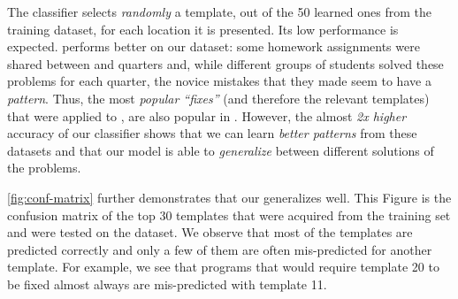 The \random classifier selects \emph{randomly} a template, out of the 50 learned
ones from the \SPRING training dataset, for each location it is presented. Its
low performance is expected. \popular performs better on our dataset: some
homework assignments were shared between \SPRING and \FALL quarters and, while
different groups of students solved these problems for each quarter, the novice
mistakes that they made seem to have a \emph{pattern}. Thus, the most
\emph{popular ``fixes''} (and therefore the relevant templates) that were
applied to \SPRING, are also popular in \FALL. However, the almost \emph{2x
higher} accuracy of our \dnn classifier shows that we can learn \emph{better
patterns} from these datasets and that our \dnn model is able to
\emph{generalize} between different solutions of the problems.

\autoref{fig:conf-matrix} further demonstrates that our \dnn generalizes well.
This Figure is the confusion matrix of the top 30 templates that were
acquired from the \SPRING training set and were tested on the \FALL dataset.
We observe that most of the templates are predicted correctly and only a
few of them are often mis-predicted for another template. For example, we see
that programs that would require template 20 to be fixed almost always are
mis-predicted with template 11.





